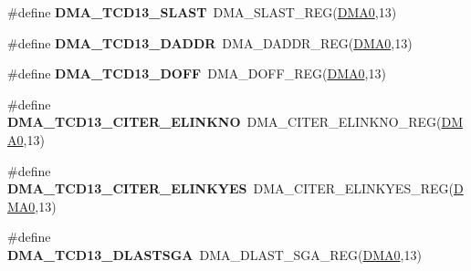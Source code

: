 \begin{DoxyCompactItemize}
\item 
\#define {\bfseries D\+M\+A\+\_\+\+T\+C\+D13\+\_\+\+S\+L\+A\+ST}~D\+M\+A\+\_\+\+S\+L\+A\+S\+T\+\_\+\+R\+EG(\hyperlink{group__DMA__Peripheral__Access__Layer_ga4103044f9ca209772f513dc694513ffb}{D\+M\+A0},13)\hypertarget{group__DMA__Register__Accessor__Macros_ga441804340780ca409f6bfe9fbf95d79f}{}\label{group__DMA__Register__Accessor__Macros_ga441804340780ca409f6bfe9fbf95d79f}

\item 
\#define {\bfseries D\+M\+A\+\_\+\+T\+C\+D13\+\_\+\+D\+A\+D\+DR}~D\+M\+A\+\_\+\+D\+A\+D\+D\+R\+\_\+\+R\+EG(\hyperlink{group__DMA__Peripheral__Access__Layer_ga4103044f9ca209772f513dc694513ffb}{D\+M\+A0},13)\hypertarget{group__DMA__Register__Accessor__Macros_ga1245031f8c78e442dc8fc199e90fd4ef}{}\label{group__DMA__Register__Accessor__Macros_ga1245031f8c78e442dc8fc199e90fd4ef}

\item 
\#define {\bfseries D\+M\+A\+\_\+\+T\+C\+D13\+\_\+\+D\+O\+FF}~D\+M\+A\+\_\+\+D\+O\+F\+F\+\_\+\+R\+EG(\hyperlink{group__DMA__Peripheral__Access__Layer_ga4103044f9ca209772f513dc694513ffb}{D\+M\+A0},13)\hypertarget{group__DMA__Register__Accessor__Macros_ga08cd40b8ffba8b31eed59271d92c8411}{}\label{group__DMA__Register__Accessor__Macros_ga08cd40b8ffba8b31eed59271d92c8411}

\item 
\#define {\bfseries D\+M\+A\+\_\+\+T\+C\+D13\+\_\+\+C\+I\+T\+E\+R\+\_\+\+E\+L\+I\+N\+K\+NO}~D\+M\+A\+\_\+\+C\+I\+T\+E\+R\+\_\+\+E\+L\+I\+N\+K\+N\+O\+\_\+\+R\+EG(\hyperlink{group__DMA__Peripheral__Access__Layer_ga4103044f9ca209772f513dc694513ffb}{D\+M\+A0},13)\hypertarget{group__DMA__Register__Accessor__Macros_gaf9ec26f9d5fe7cd9d8e82e00cc1e753c}{}\label{group__DMA__Register__Accessor__Macros_gaf9ec26f9d5fe7cd9d8e82e00cc1e753c}

\item 
\#define {\bfseries D\+M\+A\+\_\+\+T\+C\+D13\+\_\+\+C\+I\+T\+E\+R\+\_\+\+E\+L\+I\+N\+K\+Y\+ES}~D\+M\+A\+\_\+\+C\+I\+T\+E\+R\+\_\+\+E\+L\+I\+N\+K\+Y\+E\+S\+\_\+\+R\+EG(\hyperlink{group__DMA__Peripheral__Access__Layer_ga4103044f9ca209772f513dc694513ffb}{D\+M\+A0},13)\hypertarget{group__DMA__Register__Accessor__Macros_ga6749c180a5157609bfdb279a46ca1a53}{}\label{group__DMA__Register__Accessor__Macros_ga6749c180a5157609bfdb279a46ca1a53}

\item 
\#define {\bfseries D\+M\+A\+\_\+\+T\+C\+D13\+\_\+\+D\+L\+A\+S\+T\+S\+GA}~D\+M\+A\+\_\+\+D\+L\+A\+S\+T\+\_\+\+S\+G\+A\+\_\+\+R\+EG(\hyperlink{group__DMA__Peripheral__Access__Layer_ga4103044f9ca209772f513dc694513ffb}{D\+M\+A0},13)\hypertarget{group__DMA__Register__Accessor__Macros_ga53a2172bba17c20b89978635f9cad33c}{}\label{group__DMA__Register__Accessor__Macros_ga53a2172bba17c20b89978635f9cad33c}


\end{DoxyCompactItemize}
